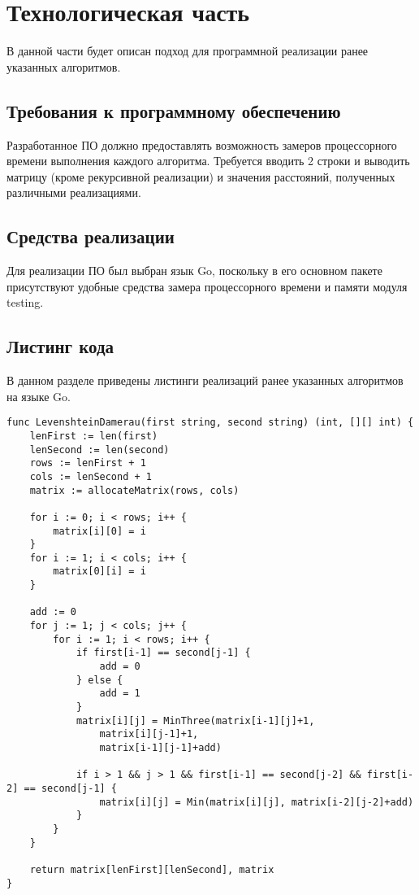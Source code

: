 \chapter{Технологическая часть}
\label{cha:impl}

В данной части будет описан подход для программной реализации ранее указанных алгоритмов.

\section{Требования к программному обеспечению}

Разработанное ПО должно предоставлять возможность замеров процессорного времени
выполнения каждого алгоритма. Требуется вводить 2 строки и выводить матрицу (кроме рекурсивной реализации) и значения расстояний, полученных различными реализациями.

\section{Средства реализации}

Для реализации ПО был выбран язык Go, поскольку в его основном пакете присутствуют
удобные средства замера процессорного времени и памяти модуля testing.

\section{Листинг кода}

В данном разделе приведены листинги реализаций ранее указанных алгоритмов на языке Go.

\lstset{language=Golang}
\begin{lstlisting}[caption={Матричная версия алгоритма Дамерау-Левенштейна}]
func LevenshteinDamerau(first string, second string) (int, [][] int) {
	lenFirst := len(first)
	lenSecond := len(second)
	rows := lenFirst + 1
	cols := lenSecond + 1
	matrix := allocateMatrix(rows, cols)

	for i := 0; i < rows; i++ {
		matrix[i][0] = i
	}
	for i := 1; i < cols; i++ {
		matrix[0][i] = i
	}

	add := 0
	for j := 1; j < cols; j++ {
		for i := 1; i < rows; i++ {
			if first[i-1] == second[j-1] {
				add = 0
			} else {
				add = 1
			}
			matrix[i][j] = MinThree(matrix[i-1][j]+1,
				matrix[i][j-1]+1,
				matrix[i-1][j-1]+add)

			if i > 1 && j > 1 && first[i-1] == second[j-2] && first[i-2] == second[j-1] {
				matrix[i][j] = Min(matrix[i][j], matrix[i-2][j-2]+add)
			}
		}
	}

	return matrix[lenFirst][lenSecond], matrix
}
\end{lstlisting}

